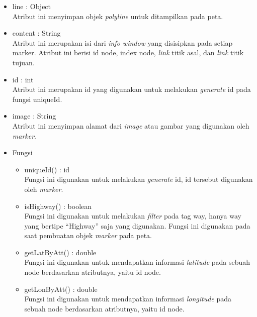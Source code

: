 \begin{itemize}
\begin{itemize}
\begin{itemize}
      \item line : Object\\
      Atribut ini menyimpan objek \textit{polyline} untuk ditampilkan pada peta.
      
      \item content : String\\
      Atribut ini merupakan isi dari \textit{info window} yang disisipkan pada
      setiap marker. Atribut ini berisi id node, index node, \textit{link} titik
      asal, dan \textit{link} titik tujuan.
      
      \item id : int\\
      Atribut ini merupakan id yang digunakan untuk melakukan \textit{generate}
      id pada fungsi uniqueId. 
      
      \item image : String\\
      Atribut ini menyimpan alamat dari \textit{image} atau gambar yang
      digunakan oleh \textit{marker}.
    \end{itemize}
  \end{itemize}
  \begin{itemize}
    \item Fungsi
    \begin{itemize}
      \item uniqueId() : id\\
      Fungsi ini digunakan untuk melakukan \textit{generate} id, id tersebut
      digunakan oleh \textit{marker}.
      
      \item isHighway() : boolean\\
      Fungsi ini digunakan untuk melakukan \textit{filter} pada tag way, hanya
      way yang bertipe ``Highway'' saja yang digunakan. Fungsi ini digunakan
      pada saat pembuatan objek \textit{marker} pada peta.
      
       \item getLatByAtt() : double\\
      Fungsi ini digunakan untuk mendapatkan informasi \textit{latitude} pada
      sebuah node berdasarkan atributnya, yaitu id node.
      
      \item getLonByAtt() : double\\
      Fungsi ini digunakan untuk mendapatkan informasi \textit{longitude} pada
      sebuah node berdasarkan atributnya, yaitu id node.
      

\end{itemize}
\end{itemize}
\end{itemize}
